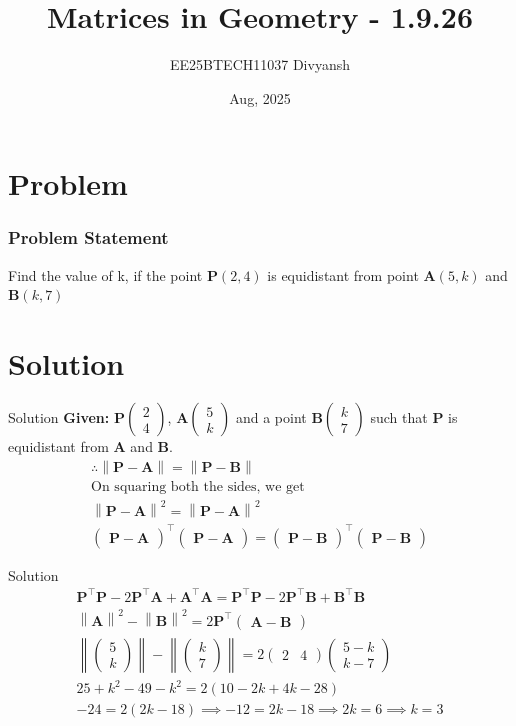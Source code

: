 \documentclass{beamer}
\title{Matrices in Geometry - 1.9.26}
\author{EE25BTECH11037  Divyansh}
\date{Aug, 2025}
\let\vec\mathbf
\providecommand{\brak}[1]{\ensuremath{\left(#1\right)}}
\theoremstyle{remark}
\providecommand{\norm}[1]{\left\lVert#1\right\rVert}
\newcommand{\myvec}[1]{\ensuremath{\begin{pmatrix}#1\end{pmatrix}}}
\begin{document}
\maketitle


\section{Problem}
\begin{frame}
\frametitle{Problem Statement}
Find the value of k, if the point $\vec{P}\brak{2,4}$ is equidistant from point $\vec{A}\brak{5,k}$ and $\vec{B}\brak{k,7}$
\end{frame}

\section{Solution}
\begin{frame}{Solution}
   \textbf{Given: } 
$\vec{P}\myvec{2\\4}$, $\vec{A}\myvec{5\\k}$ and a point $\vec{B} \myvec{k \\ 7}$ such that $\vec{P}$ is equidistant from $\vec{A}$ and $\vec{B}$. 
\begin{align}
     \therefore \norm{\vec{P}-\vec{A}}=\norm{\vec{P}-\vec{B}}\\
    \text{On squaring both the sides, we get }\\
    \norm{\vec{P}-\vec{A}}^2=\norm{\vec{P}-\vec{A}}^2\\
    \myvec{\vec{P}-\vec{A}}^{\top}\myvec{\vec{P}-\vec{A}}=\myvec{\vec{P}-\vec{B}}^{\top}\myvec{\vec{P}-\vec{B}}
\end{align}
\end{frame}

\begin{frame}{Solution}
\begin{align}
    \vec{P}^{\top}\vec{P} - 2\vec{P}^{\top}\vec{A} + \vec{A}^{\top}\vec{A} =\vec{P}^{\top}\vec{P} - 2\vec{P}^{\top}\vec{B} + \vec{B}^{\top}\vec{B}\\
    \norm{\vec{A}}^2 - \norm{\vec{B}}^2=2\vec{P}^{\top}\myvec{\vec{A}-\vec{B}}\\
    \norm{\myvec{5\\k}} - \norm{\myvec{k\\7}}=2\myvec{2 & 4}\myvec{5-k \\ k-7}\\
    25+k^2 - 49 -k^2=2\brak{10-2k + 4k-28}\\
    -24=2\brak{2k-18} \implies -12=2k-18 \implies 2k=6 \implies k=3
\end{align}
\end{frame}
\end{document}
